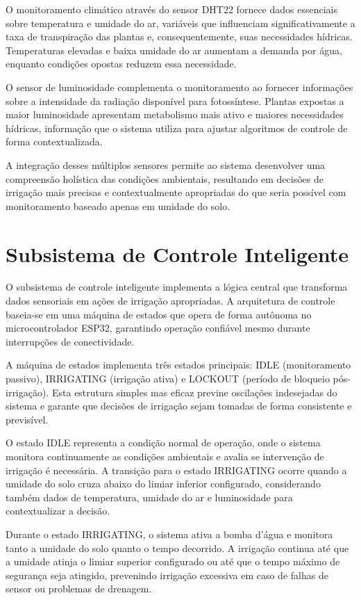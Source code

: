 \documentclass[twoside,english,brazilian]{UNISINOSmonografia}
\begin{document}
O monitoramento climático através do sensor DHT22 fornece dados essenciais sobre temperatura e umidade do ar, variáveis que influenciam significativamente a taxa de transpiração das plantas e, consequentemente, suas necessidades hídricas. Temperaturas elevadas e baixa umidade do ar aumentam a demanda por água, enquanto condições opostas reduzem essa necessidade.

O sensor de luminosidade complementa o monitoramento ao fornecer informações sobre a intensidade da radiação disponível para fotossíntese. Plantas expostas a maior luminosidade apresentam metabolismo mais ativo e maiores necessidades hídricas, informação que o sistema utiliza para ajustar algoritmos de controle de forma contextualizada.

A integração desses múltiplos sensores permite ao sistema desenvolver uma compreensão holística das condições ambientais, resultando em decisões de irrigação mais precisas e contextualmente apropriadas do que seria possível com monitoramento baseado apenas em umidade do solo.

\section{Subsistema de Controle Inteligente}

O subsistema de controle inteligente implementa a lógica central que transforma dados sensoriais em ações de irrigação apropriadas. A arquitetura de controle baseia-se em uma máquina de estados que opera de forma autônoma no microcontrolador ESP32, garantindo operação confiável mesmo durante interrupções de conectividade.

A máquina de estados implementa três estados principais: IDLE (monitoramento passivo), IRRIGATING (irrigação ativa) e LOCKOUT (período de bloqueio pós-irrigação). Esta estrutura simples mas eficaz previne oscilações indesejadas do sistema e garante que decisões de irrigação sejam tomadas de forma consistente e previsível.

O estado IDLE representa a condição normal de operação, onde o sistema monitora continuamente as condições ambientais e avalia se intervenção de irrigação é necessária. A transição para o estado IRRIGATING ocorre quando a umidade do solo cruza abaixo do limiar inferior configurado, considerando também dados de temperatura, umidade do ar e luminosidade para contextualizar a decisão.

Durante o estado IRRIGATING, o sistema ativa a bomba d'água e monitora tanto a umidade do solo quanto o tempo decorrido. A irrigação continua até que a umidade atinja o limiar superior configurado ou até que o tempo máximo de segurança seja atingido, prevenindo irrigação excessiva em caso de falhas de sensor ou problemas de drenagem.
\end{document}
